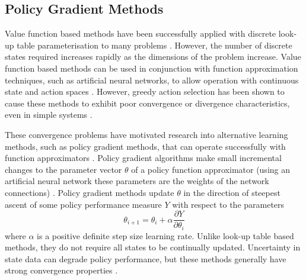 \subsection{Policy Gradient Methods}
\label{sec:policygradient}
Value function based methods have been successfully applied with discrete
look-up table parameterisation to many problems \cite{kaelbling:1996}.  However,
the number of discrete states required increases rapidly as the dimensions of
the problem increase.
Value function based methods can be used in conjunction with function
approximation techniques, such as artificial neural networks, to allow operation
with continuous state and action spaces \cite{sutton:1996}.  However, greedy
action selection has been shown to cause these methods to exhibit poor
convergence or divergence characteristics, even in simple systems
\cite{tsitsiklis:94,peters:enac,gordon:95,baird:95}.

These convergence problems have motivated research into alternative learning
methods, such as policy gradient methods, that can operate successfully with
function approximators \cite{peters:enac}. Policy gradient algorithms make small
incremental changes to the parameter vector $\theta$ of a policy function
approximator (using an artificial neural network these parameters are the
weights of the network connections) \cite{sutton:2000}. Policy gradient methods
update $\theta$ in the direction of steepest ascent of some policy performance
measure $Y$ with respect to the parameters
\begin{equation}
\theta_{i+1} = \theta_i + \alpha \frac{\partial Y}{\partial \theta_i}
\end{equation}
where $\alpha$ is a positive definite step size learning rate.  Unlike look-up
table based methods, they do not require all states to be continually updated.
Uncertainty in state data can degrade policy performance, but these methods
generally have strong convergence properties \cite{sutton:2000}.

